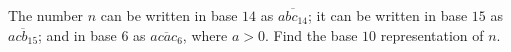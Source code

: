 The number $n$ can be written in base $14$ as $\overline{abc_{14}}$; it can be written in base $15$ as $\overline{acb_{15}}$; and in base $6$ as $\overline{acac_{6}}$, where $a>0$. Find the base $10$ representation of $n$. 
